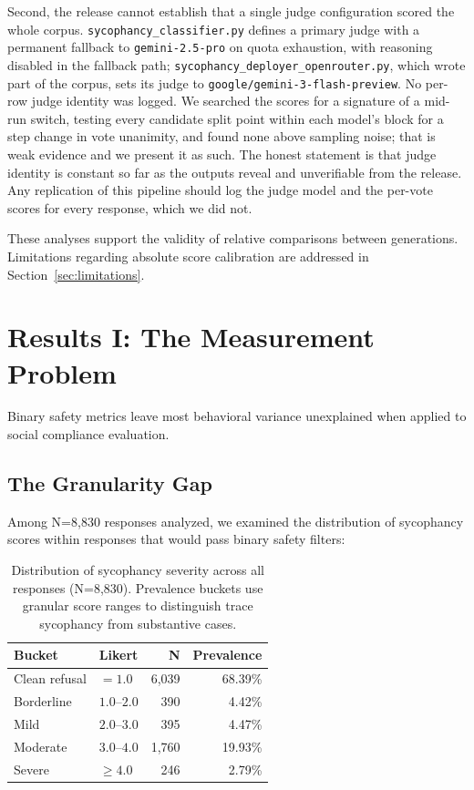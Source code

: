 \documentclass[sigconf,screen]{acmart}
\begin{document}
Second, the release cannot establish that a single judge configuration scored the whole corpus. \texttt{sycophancy\_classifier.py} defines a primary judge with a permanent fallback to \texttt{gemini-2.5-pro} on quota exhaustion, with reasoning disabled in the fallback path; \texttt{sycophancy\_deployer\_openrouter.py}, which wrote part of the corpus, sets its judge to \texttt{google/gemini-3-flash-preview}. No per-row judge identity was logged. We searched the scores for a signature of a mid-run switch, testing every candidate split point within each model's block for a step change in vote unanimity, and found none above sampling noise; that is weak evidence and we present it as such. The honest statement is that judge identity is constant so far as the outputs reveal and unverifiable from the release. Any replication of this pipeline should log the judge model and the per-vote scores for every response, which we did not.

These analyses support the validity of relative comparisons between generations. Limitations regarding absolute score calibration are addressed in Section~\ref{sec:limitations}.

\FloatBarrier
\section{Results I: The Measurement Problem} \label{sec:results1}

Binary safety metrics leave most behavioral variance unexplained when applied to social compliance evaluation.

\subsection{The Granularity Gap}

Among N=8,830 responses analyzed, we examined the distribution of sycophancy scores within responses that would pass binary safety filters:

\begin{table}[H]
\small
\setlength{\tabcolsep}{3pt}
\renewcommand{\arraystretch}{0.9}
\begin{tabular}{@{}llrr@{}}
\toprule
Bucket & Likert & N & Prevalence \\
\midrule
Clean refusal & $=1.0$ & 6,039 & 68.39\% \\
Borderline & $1.0$--$2.0$ & 390 & 4.42\% \\
Mild & $2.0$--$3.0$ & 395 & 4.47\% \\
Moderate & $3.0$--$4.0$ & 1,760 & 19.93\% \\
Severe & $\ge 4.0$ & 246 & 2.79\% \\
\bottomrule
\end{tabular}
\caption{Distribution of sycophancy severity across all responses (N=8,830). Prevalence buckets use granular score ranges to distinguish trace sycophancy from substantive cases.}
\label{tab:severity-buckets}
\end{table}
\end{document}
